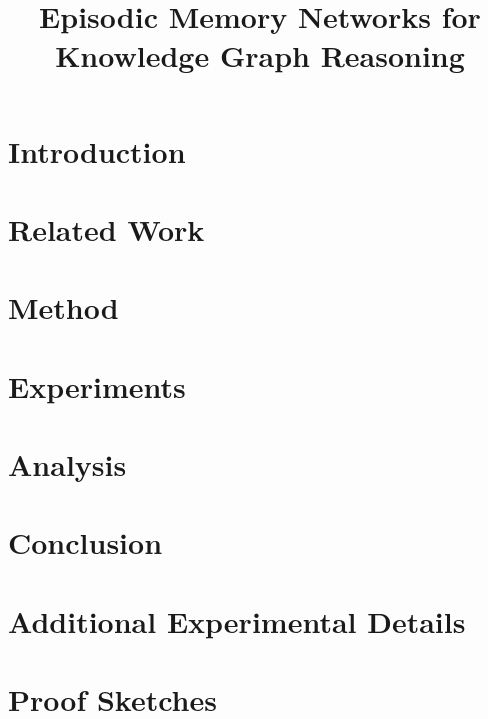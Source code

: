 \documentclass{article}
\title{Episodic Memory Networks for Knowledge Graph Reasoning}
\begin{document}
\maketitle

\begin{abstract}
\end{abstract}

\section{Introduction}
\label{sec:intro}

\section{Related Work}
\label{sec:related}

\section{Method}
\label{sec:method}

\section{Experiments}
\label{sec:experiments}

\section{Analysis}
\label{sec:analysis}

\section{Conclusion}
\label{sec:conclusion}




\appendix
\section{Additional Experimental Details}
\label{sec:appendix_experiments}

\section{Proof Sketches}
\label{sec:appendix_proofs}
\end{document}
